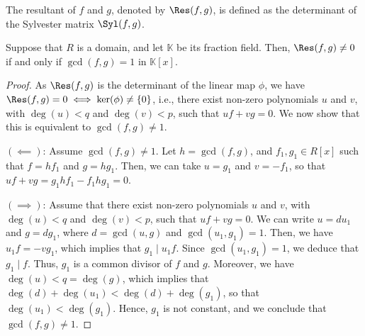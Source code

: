 \begin{definition}[Resultant]
    The resultant of $f$ and $g$, denoted by $\Res(f,g)$, is defined as the determinant of the Sylvester matrix $\Syl(f,g)$.
\end{definition}

\begin{proposition}
    Suppose that $R$ is a domain, and let $\mathbb{K}$ be its fraction field. Then, $\Res(f,g)\neq 0$ if and only if $\gcd(f,g)=1$ in $\mathbb{K}[x]$.
\end{proposition}

\begin{proof}
    As $\Res(f,g)$ is the determinant of the linear map $\phi$, we have $\Res(f,g) = 0\iff \ker(\phi)\neq \{0\}$, i.e., there exist non-zero polynomials $u$ and $v$, with $\deg(u)<q$ and $\deg(v)<p$, such that $uf+vg=0$. We now show that this is equivalent to $\gcd(f,g)\neq 1$.

    $(\impliedby)$: Assume $\gcd(f,g)\neq 1$. Let $h=\gcd(f,g)$, and $f_1,g_1\in R[x]$ such that $f=hf_1$ and $g=hg_1$. Then, we can take $u=g_1$ and $v=-f_1$, so that $uf+vg=g_1hf_1-f_1hg_1=0$.

    $(\implies)$: Assume that there exist non-zero polynomials $u$ and $v$, with $\deg(u)<q$ and $\deg(v)<p$, such that $uf+vg=0$. We can write $u=d u_1$ and $g=d g_1$, where $d=\gcd(u,g)$ and $\gcd(u_1,g_1)=1$. Then, we have $u_1 f=-v g_1$, which implies that $g_1\mid u_1 f$. Since $\gcd(u_1,g_1)=1$, we deduce that $g_1\mid f$. Thus, $g_1$ is a common divisor of $f$ and $g$. Moreover, we have $\deg(u)<q=\deg(g)$, which implies that $\deg(d)+\deg(u_1)<\deg(d)+\deg(g_1)$, so that $\deg(u_1)<\deg(g_1)$. Hence, $g_1$ is not constant, and we conclude that $\gcd(f,g)\neq 1$.
\end{proof}
